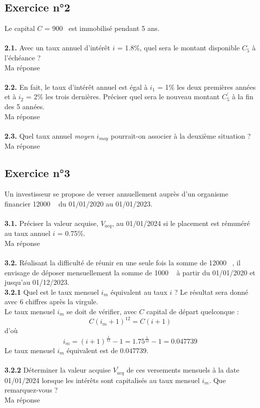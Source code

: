 \documentclass{article}
\begin{document}
\subsection{Exercice n°2}
\textcolor{exogris}{
Le capital $C$ = 900 \texteuro est immobilisé pendant 5 ans.
}
\\\\ \textcolor{exogris}{\textbf{2.1.}
Avec un taux annuel d’intérêt $i$ = 1.8\%, quel sera le montant disponible $C_5$ à l’échéance ?
}
\\%
Ma réponse
\\%
\\%
\textcolor{exogris}{\textbf{2.2.}
En fait, le taux d’intérêt annuel est égal à $i_1$ = 1\% les deux premières années et à $i_2$ = 2\% les trois dernières. Préciser quel sera le nouveau montant $C^{'}_5$ à la fin des 5 années.
}
\\%
Ma réponse
\\%
\\%
\textcolor{exogris}{\textbf{2.3.}
Quel taux annuel \textit{moyen} $i_{moy}$ pourrait-on associer à la deuxième situation ?
}%
\\%
Ma réponse


\subsection{Exercice n°3}
\textcolor{exogris}{
Un investisseur se propose de verser annuellement auprès d’un organisme financier 12000 \texteuro  du 01/01/2020 au 01/01/2023.
}
\\\\ \textcolor{exogris}{\textbf{3.1.}
Préciser la valeur acquise, $V_{acq}$, au 01/01/2024 si le placement est rémunéré au taux annuel $i$ = 0.75\%.
}
\\%
Ma réponse
\\%
\\%
\textcolor{exogris}{\textbf{3.2.}
Réalisant la difficulté de réunir en une seule fois la somme de 12000 \texteuro , il envisage de déposer mensuellement la somme de 1000 \texteuro  à partir du 01/01/2020 et jusqu’au 01/12/2023.
}
\\%
\textcolor{exogris}{\textbf{3.2.1}
Quel est le taux mensuel $i_m$ équivalent au taux $i$ ? Le résultat sera donné avec 6 chiffres après la virgule.
}%
\\%
Le taux mensuel $i_m$ se doit de vérifier, avec $C$ capital de départ quelconque :
$$C(i_m + 1)^{12} = C(i+1)$$
d'où
$$\boxed{i_m = (i+1)^{\frac{1}{12}} - 1} = 1.75^{\frac{1}{12}}-1 = \boxed{0.047739}$$
Le taux mensuel $i_m$ équivalent est de $0.047739$.
\\%
\\%
\textcolor{exogris}{\textbf{3.2.2}
Déterminer la valeur acquise $V^{'}_{acq}$ de ces versements mensuels à la date 01/01/2024 lorsque les intérêts sont capitalisés au taux mensuel $i_m$. Que remarquez-vous ?
}%
\\%
Ma réponse
\end{document}
